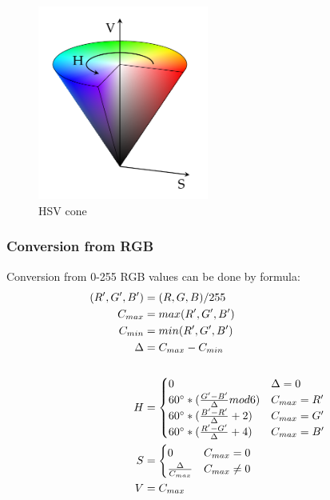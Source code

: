 \documentclass[titlepage]{article}
\begin{document}
\begin{figure}[!htb]
	\centering
	\includegraphics[width=0.5\textwidth]{img/hsv.png} 
	\caption{HSV cone}
	\label{fig:hsv}
\end{figure}

\subsubsection{Conversion from RGB}
Conversion from 0-255 RGB values can be done by formula:
\begin{equation}
\begin{split}
(R', G', B')&=(R, G, B)/255\\
C_{max}&=max(R', G', B')\\
C_{min}&=min(R', G', B')\\
\Delta&=C_{max}-C_{min}\\
\\
H&=\begin{cases}
0 & \Delta=0 \\
60\degree*(\frac{G'-B'}{\Delta}mod6) & C_{max}=R' \\
60\degree*(\frac{B'-R'}{\Delta}+2) & C_{max}=G' \\
60\degree*(\frac{R'-G'}{\Delta}+4) & C_{max}=B'
\end{cases} \\
S&=\begin{cases}
0 & C_{max}=0 \\
\frac{\Delta}{C_{max}} & C_{max} \neq 0
\end{cases}\\
V&=C_{max}
\end{split}
\end{equation}
\end{document}
